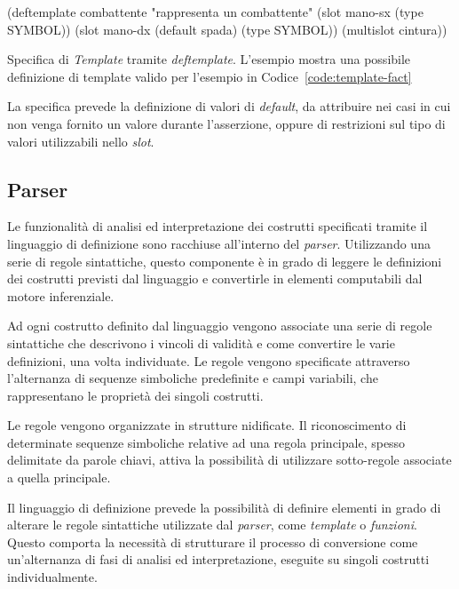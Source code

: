 \begin{program}
\begin{verbatimtab}

(deftemplate combattente "rappresenta un combattente"
	(slot mano-sx 
		(type SYMBOL))
	(slot mano-dx
		(default spada)
		(type SYMBOL))
	(multislot cintura))
\end{verbatimtab}
\caption{Specifica di \emph{Template} tramite \emph{deftemplate}. L'esempio mostra una possibile definizione di template valido per l'esempio in Codice~\ref{code:template-fact}}\label{code:deftemplate}
\end{program}

La specifica prevede la definizione di valori di \emph{default}, da attribuire nei casi in cui non venga fornito un valore durante l'asserzione, oppure di restrizioni sul tipo di valori utilizzabili nello \emph{slot}.


\subsection{Parser}\label{par:parser}

Le funzionalità di analisi ed interpretazione dei costrutti specificati tramite il linguaggio di definizione sono racchiuse all'interno del \emph{parser}. Utilizzando una serie di regole sintattiche, questo componente è in grado di leggere le definizioni dei costrutti previsti dal linguaggio e convertirle in elementi computabili dal motore inferenziale.

Ad ogni costrutto definito dal linguaggio vengono associate una serie di regole sintattiche che descrivono i vincoli di validità e come convertire le varie definizioni, una volta individuate. Le regole vengono specificate attraverso l'alternanza di sequenze simboliche predefinite e campi variabili, che rappresentano le proprietà dei singoli costrutti.

Le regole vengono organizzate in strutture nidificate. Il riconoscimento di determinate sequenze simboliche relative ad una regola principale, spesso delimitate da parole chiavi, attiva la possibilità di utilizzare sotto-regole associate a quella principale.

Il linguaggio di definizione prevede la possibilità di definire elementi in grado di alterare le regole sintattiche utilizzate dal \emph{parser}, come \emph{template} o \emph{funzioni}. Questo comporta la necessità di strutturare il processo di conversione come un'alternanza di fasi di analisi ed interpretazione, eseguite su singoli costrutti individualmente.

